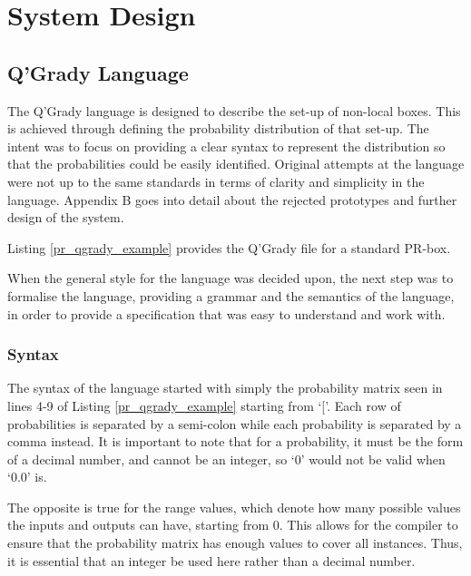 \documentclass[report.tex]{subfiles}
\begin{document}
\chapter{System Design} %
\label{cha:system_design}
\section{Q'Grady Language} %
\label{sec:q_grady_language}
The Q'Grady language is designed to describe the set-up of non-local boxes.
This is achieved through defining the probability distribution of that set-up.
The intent was to focus on providing a clear syntax to represent the distribution
so that the probabilities could be easily identified. Original attempts at the
language were not up to the same standards in terms of clarity and simplicity in
the language. Appendix B goes into detail about the rejected prototypes and
further design of the system.

Listing \ref{pr_qgrady_example} provides the Q'Grady file for a standard PR-box.

 

When the general style for the language was decided upon, the next step was to
formalise the language, providing a grammar and the semantics of the language,
in order to provide a specification that was easy to understand and work with.

\subsection{Syntax} %
\label{sub:syntax}
The syntax of the language started with simply the probability matrix seen in
lines 4-9 of Listing \ref{pr_qgrady_example} starting from `['. Each row of
probabilities is separated by a semi-colon while each probability is separated
by a comma instead. It is important to note that for a probability, it must be
the form of a decimal number, and cannot be an integer, so `0' would not be
valid when `0.0' is.

The opposite is true for the range values, which denote how many possible values
the inputs and outputs can have, starting from 0. This allows for the compiler
to ensure that the probability matrix has enough values to cover all instances.
Thus, it is essential that an integer be used here rather than a decimal number.
\end{document}
